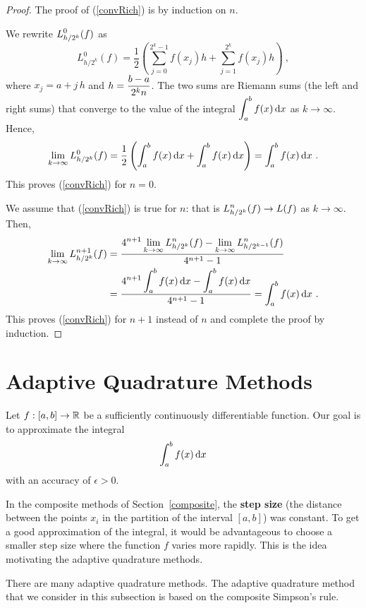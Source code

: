 \begin{proof}
The proof of (\ref{convRich}) is by induction on $n$.

We rewrite $\displaystyle L_{h/2^k}^0(f)$ as
\[
L_{h/2^k}^0(f) = \frac{1}{2} \left( \sum_{j=0}^{2^k-1} f(x_j) h +
\sum_{j=1}^{2^k} f(x_j) h \right) \ ,
\]
where $x_j = a + j\,h$ and $\displaystyle h=\frac{b-a}{2^k n}$.  The
two sums are Riemann sums (the left and right sums) that converge to
the value of the integral
$\displaystyle \int_a^b f(x)\,\mathrm{d}x$ as $k\to \infty$.
Hence,
\[
\lim_{k\to \infty} L_{h/2^k}^0(f) =
\frac{1}{2}\left( \int_a^b f(x)\,\mathrm{d}x + \int_a^b f(x)\,\mathrm{d}x \right)
= \int_a^b f(x)\,\mathrm{d}x \ .
\]
This proves (\ref{convRich}) for $n=0$.

We assume that (\ref{convRich}) is true for $n$: that is
$\displaystyle L_{h/2^k}^{n}(f) \rightarrow L(f)$ as
$k\rightarrow \infty$.
Then,
\begin{align*}
\lim_{k\rightarrow \infty} L_{h/2^k}^{n+1}(f) &=
\frac{\displaystyle 4^{n+1} \lim_{k\rightarrow \infty}L_{h/2^k}^n(f)
- \lim_{k\rightarrow \infty}L_{h/2^{k-1}}^n(f) }
{4^{n+1} - 1} \\
&= \frac{\displaystyle 4^{n+1} \int_a^b f(x) \,\mathrm{d}x - \int_a^b f(x) \,\mathrm{d}x}
{4^{n+1} - 1}
= \int_a^b f(x) \,\mathrm{d}x \ .
\end{align*}
This proves (\ref{convRich}) for $n+1$ instead of $n$ and complete the
proof by induction.
\end{proof}

\section{Adaptive Quadrature Methods}\label{SectAdaptQMethod}

Let $f:[a,b] \rightarrow \mathbb{R}$ be a sufficiently continuously
differentiable function.  Our goal is to approximate the integral
\[
\int_a^b f(x) \,\mathrm{d}x
\]
with an accuracy of $\epsilon >0$.

In the composite methods of Section~\ref{composite}, the
{\bfseries step size} (the distance
between the points $x_i$ in the
partition of the interval $[a,b]$) was constant.  To get a good
approximation of the integral, it would be advantageous to choose a
smaller step size where the function $f$ varies more rapidly.  This is
the idea motivating the adaptive quadrature methods.

There are many adaptive quadrature methods.  The adaptive quadrature
method that we consider in this subsection is based on the composite
Simpson's rule.

